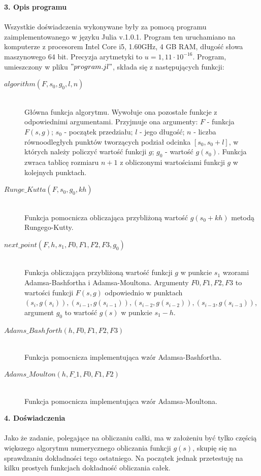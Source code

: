 \documentclass[a4paper]{article}
\begin{document}
\Large
\textbf{3. Opis programu}\\\\
\normalsize
Wszystkie doświadczenia wykonywane były za pomocą programu zaimplementowanego w języku Julia v.1.0.1. Program ten uruchamiano na komputerze z procesorem Intel Core i5, 1.60GHz, 4 GB RAM, długość słowa maszynowego 64 bit. Precyzja arytmetyki to $u = 1,11 \cdot 10^{-16}$. Program, umieszczony w pliku $"program.jl"$, składa się z następujących funkcji:
\begin{description}
\item[$algorithm(F, s_0, g_0, l, n)$] \hfill\\ Główna funkcja algorytmu. Wywołuje ona pozostałe funkcje z odpowiednimi argumentami. Przyjmuje ona argumenty: $F$ - funkcja $F(s, g)$; $s_0$ - początek przedziału; $l$ - jego długość; $n$ - liczba równoodległych punktów tworzących podział odcinka $[s_0, s_0 + l]$, w których należy policzyć wartość funkcji $g$; $g_0$ - wartość $g(s_0)$. Funkcja zwraca tablicę rozmiaru $n+1$ z obliczonymi wartościami funkcji $g$ w kolejnych punktach.
\item[$Runge\_Kutta(F, s_0, g_0, kh)$] \hfill\\ Funkcja pomocnicza obliczająca przybliżoną wartość $g(s_0 + kh)$ metodą Rungego-Kutty.
\item[$next\_point(F, h, s_1, F0, F1, F2, F3, g_0)$] \hfill\\ Funkcja obliczająca przybliżoną wartość funkcji $g$ w punkcie $s_1$ wzorami Adamsa-Bashfortha i Adamsa-Moultona. Argumenty $F0, F1, F2, F3$ to wartości funkcji $F(s,g)$ odpowiednio w punktach $(s_i, g(s_i)), (s_{i-1}, g(s_{i-1})), (s_{i-2}, g(s_{i-2})), (s_{i-3}, g(s_{i-3}))$, argument $g_0$ to wartość $g(s)$ w punkcie $s_1 - h$.
\item[$Adams\_Bashforth(h, F0, F1, F2, F3)$] \hfill\\ Funkcja pomocnicza implementująca wzór Adamsa-Bashfortha.
\item[$Adams\_Moulton(h, F\_1, F0, F1, F2)$] \hfill\\ Funkcja pomocnicza implementująca wzór Adamsa-Moultona.
\end{description}
\newpage



\Large
\textbf{4. Doświadczenia}\\\\
\normalsize
Jako że zadanie, polegające na obliczaniu całki, ma w założeniu być tylko częścią większego algorytmu numerycznego obliczania funkcji $g(s)$, skupię się na sprawdzaniu dokładności tego ostatniego. Na początek jednak przetestuję na kilku prostych funkcjach dokładność obliczania całek.\\
\end{document}

